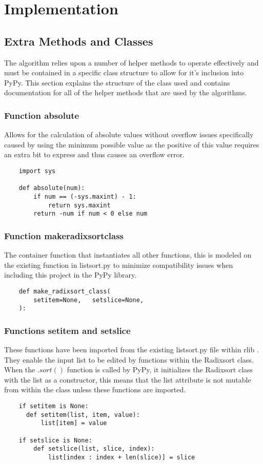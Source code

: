 \documentclass[12pt]{article}
\begin{document}
\section{Implementation}
\subsection{Extra Methods and Classes}
The algorithm relies upon a number of helper methods to operate effectively and must be contained in a specific class structure to allow for it's inclusion into PyPy. This section explains the structure of the class used and contains documentation for all of the helper methods that are used by the algorithms.

\subsubsection{Function absolute}
Allows for the calculation of absolute values without overflow issues specifically caused by using the minimum possible value as the positive of this value requires an extra bit to express and thus causes an overflow error.
\begin{lstlisting}
	import sys
        
	def absolute(num):
        if num == (-sys.maxint) - 1:
			return sys.maxint
        return -num if num < 0 else num
\end{lstlisting}

\subsubsection{Function make\textunderscore radixsort\textunderscore class}
The container function that instantiates all other functions, this is modeled on the existing function in listsort.py \cite{listsort} to minimize compatibility issues when including this project in the PyPy library.
\begin{lstlisting}
    def make_radixsort_class(
        setitem=None,	setslice=None,
    ):
  \end{lstlisting}
\subsubsection{Functions setitem and setslice}
These functions have been imported from the existing listsort.py file within rlib \cite{listsort}. They enable the input list to be edited by functions within the Radixsort class. When the $.sort()$ function is called by PyPy, it initializes the Radixsort class with the list as a constructor, this means that the list attribute is not mutable from within the class unless these functions are imported.
\begin{lstlisting}
    if setitem is None:
      def setitem(list, item, value):
          list[item] = value
	
	if setslice is None:
		def setslice(list, slice, index):
			list[index : index + len(slice)] = slice
  \end{lstlisting}
\end{document}
